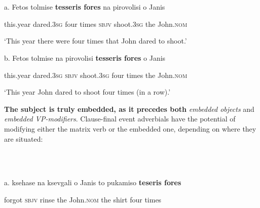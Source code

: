 \documentclass[output=paper]{langsci/langscibook}
\begin{document}
\begin{styleNurTexti}
\ea%
    \label{ex:key:8}
    \gll\\
        \\
    \glt
    \z

          a.  Fetos  tolmise     \textbf{tesseris  fores} na   pirovolisi  o    Janis
\end{styleNurTexti}

\begin{styleNurTexti}
    this.year dared.\textsc{3sg}  four    times  \textsc{sbjv} shoot.\textsc{3sg}   the  John.\textsc{nom}
\end{styleNurTexti}

\begin{styleNurTexti}
    ‘This year there were four times that John dared to shoot.’ 
\end{styleNurTexti}

\begin{styleNurTexti}
  b.  Fetos  tolmise  na    pirovolisi  \textbf{tesseris  fores} o    Janis
\end{styleNurTexti}

\begin{styleNurTexti}
    this.year  dared.\textsc{3sg}  \textsc{sbjv} shoot.\textsc{3sg}   four  times  the  John.\textsc{nom}
\end{styleNurTexti}

\begin{styleNurTexti}
    ‘This year John dared to shoot four times (in a row).’
\end{styleNurTexti}

\begin{styleNurTexti}
\textbf{The subject is truly embedded, as it precedes both} \textit{embedded objects} and \textit{embedded VP-modifiers}. Clause-final event adverbials have the potential of modifying either the matrix verb or the embedded one, depending on where they are situated:
\end{styleNurTexti}

\begin{styleNurTexti}
\ea%
    \label{ex:key:9}
    \gll\\
        \\
    \glt
    \z

          a.  ksehase  na    ksevgali  o    Janis       to    pukamiso  \textbf{teseris  fores}
\end{styleNurTexti}

\begin{styleNurTexti}
    forgot   \textsc{sbjv} rinse   the  John.\textsc{nom} the  shirt        four     times  
\end{styleNurTexti}
\end{document}
